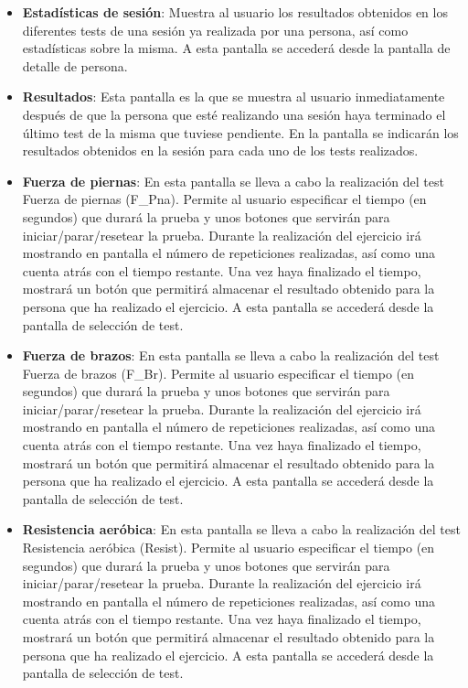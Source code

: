 \begin{itemize}
\item \textbf{Estadísticas de sesión}: Muestra al usuario los resultados obtenidos en los diferentes tests de una sesión ya realizada por una persona, así como estadísticas sobre la misma. A esta pantalla se accederá desde la pantalla de detalle de persona.
\item \textbf{Resultados}: Esta pantalla es la que se muestra al usuario inmediatamente después de que la persona que esté realizando una sesión haya terminado el último test de la misma que tuviese pendiente. En la pantalla se indicarán los resultados obtenidos en la sesión para cada uno de los tests realizados.
\item \textbf{Fuerza de piernas}: En esta pantalla se lleva a cabo la realización del test Fuerza de piernas (F\_Pna). Permite al usuario especificar el tiempo (en segundos) que durará la prueba y unos botones que servirán para iniciar/parar/resetear la prueba. Durante la realización del ejercicio irá mostrando en pantalla el número de repeticiones realizadas, así como una cuenta atrás con el tiempo restante. Una vez haya finalizado el tiempo, mostrará un botón que permitirá almacenar el resultado obtenido para la persona que ha realizado el ejercicio. A esta pantalla se accederá desde la pantalla de selección de test.
\item \textbf{Fuerza de brazos}: En esta pantalla se lleva a cabo la realización del test Fuerza de brazos (F\_Br). Permite al usuario especificar el tiempo (en segundos) que durará la prueba y unos botones que servirán para iniciar/parar/resetear la prueba. Durante la realización del ejercicio irá mostrando en pantalla el número de repeticiones realizadas, así como una cuenta atrás con el tiempo restante. Una vez haya finalizado el tiempo, mostrará un botón que permitirá almacenar el resultado obtenido para la persona que ha realizado el ejercicio. A esta pantalla se accederá desde la pantalla de selección de test.
\item \textbf{Resistencia aeróbica}: En esta pantalla se lleva a cabo la realización del test Resistencia aeróbica (Resist). Permite al usuario especificar el tiempo (en segundos) que durará la prueba y unos botones que servirán para iniciar/parar/resetear la prueba. Durante la realización del ejercicio irá mostrando en pantalla el número de repeticiones realizadas, así como una cuenta atrás con el tiempo restante. Una vez haya finalizado el tiempo, mostrará un botón que permitirá almacenar el resultado obtenido para la persona que ha realizado el ejercicio. A esta pantalla se accederá desde la pantalla de selección de test.

\end{itemize}
